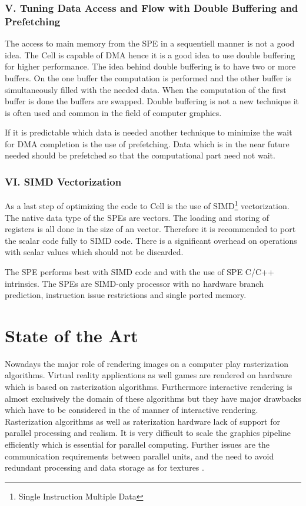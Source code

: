 \documentclass[DIV10, abstracton, openright, footsepline, headsepline, twoside, 9pt,
bigheadings]{scrreprt}
\begin{document}
\subsubsection*{V. Tuning Data Access and Flow with Double Buffering and
Prefetching}
The access to main memory from the SPE in a sequentiell manner is not a good idea.
 The Cell is capable of DMA hence it is a good idea to use double buffering for
higher performance. The idea behind double buffering is to have two or more buffers.
 On the one buffer the computation is performed and the other buffer is
simultaneously filled with the needed data. When the computation of the first
buffer is done the buffers are swapped. Double buffering is not a new technique
it is often used and common in the field of computer graphics.

If it is predictable which data is needed another technique to minimize the wait
for DMA completion is the use of prefetching. Data which is in the near future
needed should be prefetched so that the computational part need not wait.


\subsubsection*{VI. SIMD Vectorization}
As a last step of optimizing the code to Cell is the use of
SIMD\footnote{Single Instruction Multiple Data} vectorization. The native data type
of the SPEs are vectors. The loading and storing of registers is all done in the
size of an vector. Therefore it is recommended to port the scalar code fully to SIMD
 code. There is a significant overhead on operations with scalar values which should
 not be discarded.

The SPE performs best with SIMD code and with the use of SPE C/C++ intrinsics.
The SPEs are SIMD-only processor with no hardware branch prediction,
instruction issue restrictions and single ported memory.

\section{State of the Art}
Nowadays the major role of rendering images on a computer play rasterization
algorithms. Virtual reality applications as well games are rendered on hardware which
 is based on rasterization algorithms. Furthermore interactive rendering is almost
 exclusively the domain of these algorithms but they have major drawbacks which have
 to be considered in the of manner of interactive rendering. Rasterization algorithms
as well as raterization hardware lack of support for parallel processing and realism. It is very difficult
 to scale the graphics pipeline efficiently which is essential for parallel computing.
 Further issues are the communication requirements between parallel units, and the
 need to avoid redundant processing and data storage as for textures \cite{Eldrigde00}.
\end{document}

